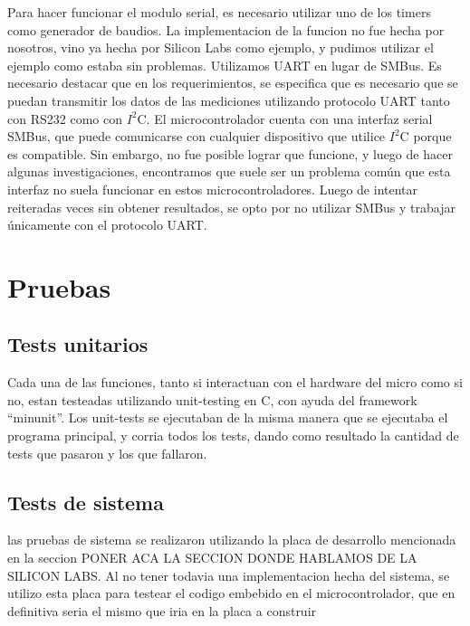 Para hacer funcionar el modulo serial, es necesario utilizar uno de los timers como generador de baudios. La implementacion de la funcion no fue hecha por nosotros, vino ya hecha por Silicon Labs como ejemplo, y pudimos utilizar el ejemplo como estaba sin problemas. Utilizamos UART en lugar de SMBus. Es necesario destacar que en los requerimientos, se especifica que es necesario que se puedan transmitir los datos de las mediciones utilizando protocolo UART tanto con RS232 como con $I^{2}$C. El microcontrolador cuenta con una interfaz serial  SMBus, que puede comunicarse con cualquier dispositivo que utilice $I^{2}$C porque es compatible. Sin embargo, no fue posible lograr que funcione, y luego de hacer algunas investigaciones, encontramos que suele ser un problema común que esta interfaz no suela funcionar en estos microcontroladores. Luego de intentar reiteradas veces sin obtener resultados, se opto por no utilizar SMBus y trabajar únicamente con el protocolo UART.



\section{Pruebas} %
\label{it2:sec:pruebas}


\subsection{Tests unitarios} %
\label{it2:sub:tests_unitarios}

Cada una de las funciones, tanto si interactuan con el hardware del micro como si no, estan testeadas utilizando unit-testing en C, con ayuda del framework ``minunit''\cite{minunit}. Los unit-tests se ejecutaban de la misma manera que se ejecutaba el programa principal, y corria todos los tests, dando como resultado la cantidad de tests que pasaron y los que fallaron.


\subsection{Tests de sistema} %
\label{it2:sub:tests_de_sistema}

las pruebas de sistema se realizaron utilizando la placa de desarrollo mencionada en la seccion PONER ACA LA SECCION DONDE HABLAMOS DE LA SILICON LABS. Al no tener todavia una implementacion hecha del sistema, se utilizo esta placa para testear el codigo embebido en el microcontrolador, que en definitiva seria el mismo que iria en la placa a construir

